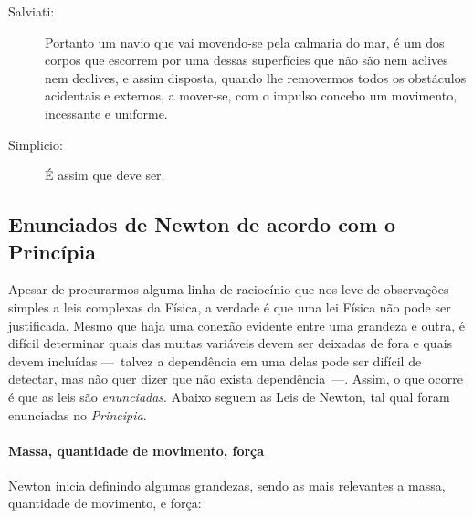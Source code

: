 \begin{description}
\item[Salviati:] Portanto um navio que vai movendo-se pela calmaria do mar, é um dos corpos que escorrem por uma dessas superfícies que não são nem aclives nem declives, e assim disposta, quando lhe removermos todos os obstáculos acidentais e externos, a mover-se, com o impulso concebo um movimento, incessante e uniforme.

\item[Simplicio:] É assim que deve ser.

\end{description}

\subsection{Enunciados de Newton de acordo com o Princípia}
\label{Sec:EnunciadosNewton}

Apesar de procurarmos alguma linha de raciocínio que nos leve de observações simples a leis complexas da Física, a verdade é que uma lei Física não pode ser justificada. Mesmo que haja uma conexão evidente entre uma grandeza e outra, é difícil determinar quais das muitas variáveis devem ser deixadas de fora e quais devem incluídas ---~talvez a dependência em uma delas pode ser difícil de detectar, mas não quer dizer que não exista dependência~---. Assim, o que ocorre é que as leis são \emph{enunciadas}. Abaixo seguem as Leis de Newton, tal qual foram enunciadas no \emph{Principia}.

\paragraph{Massa, quantidade de movimento, força}

Newton inicia definindo algumas grandezas, sendo as mais relevantes a massa, quantidade de movimento, e força:

